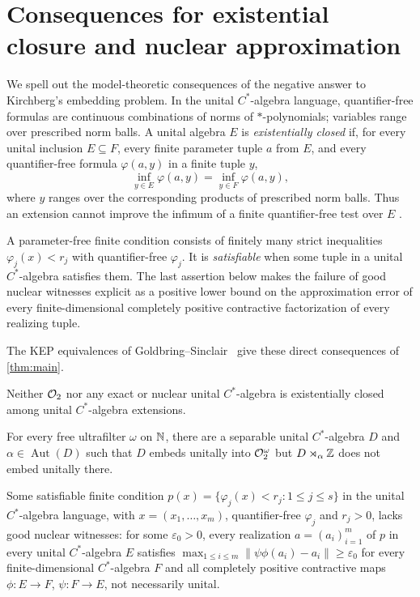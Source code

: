 \section{Consequences for existential closure and nuclear approximation}
\label{sec:consequences}

We spell out the model-theoretic consequences of the negative answer to
Kirchberg's embedding problem. In the unital $C^*$-algebra language,
quantifier-free formulas are continuous combinations of norms of
$*$-polynomials; variables range over prescribed norm balls.
A unital algebra $E$ is \emph{existentially closed} if, for every unital
inclusion $E\subseteq F$, every finite parameter tuple $a$ from $E$,
and every quantifier-free formula $\varphi(a,y)$ in a finite tuple $y$,
\[
 \inf_{y\in E}\varphi(a,y)=\inf_{y\in F}\varphi(a,y),
\]
where $y$ ranges over the corresponding products of prescribed norm balls.
Thus an extension
cannot improve the infimum of a finite quantifier-free test over $E$
\cite[Section~2.1]{GoldbringSinclair2015}.

A parameter-free finite condition consists of finitely many strict
inequalities $\varphi_j(x)<r_j$ with quantifier-free $\varphi_j$.
It is \emph{satisfiable} when some tuple in a unital $C^*$-algebra
satisfies them. The last assertion below makes the failure of good nuclear
witnesses explicit as a positive lower bound on the approximation error
of every finite-dimensional completely positive contractive factorization
of every realizing tuple.

The KEP equivalences of
Goldbring--Sinclair~\cite[Proposition~3.2 and Theorems~3.3 and~3.7]{GoldbringSinclair2015}
give these direct consequences of \cref{thm:main}.

\begin{corollary}\label{cor:kep-consequences}
Neither $\mathcal O_2$ nor any exact or nuclear unital $C^*$-algebra is
existentially closed among unital $C^*$-algebra extensions.

For every free ultrafilter $\omega$ on $\mathbb N$, there are a separable
unital $C^*$-algebra $D$ and $\alpha\in\operatorname{Aut}(D)$ such that
$D$ embeds unitally into $\mathcal O_2^\omega$ but $D\rtimes_\alpha\mathbb Z$ does not
embed unitally there.

Some satisfiable finite condition
$p(x)=\{\varphi_j(x)<r_j:1\le j\le s\}$ in the unital $C^*$-algebra
language, with $x=(x_1,\ldots,x_m)$, quantifier-free $\varphi_j$ and
$r_j>0$, lacks good nuclear witnesses: for some $\varepsilon_0>0$,
every realization $a=(a_i)_{i=1}^m$ of $p$ in every unital $C^*$-algebra
$E$ satisfies $\max_{1\le i\le m}\|\psi\phi(a_i)-a_i\|\ge\varepsilon_0$
for every finite-dimensional $C^*$-algebra $F$ and all completely positive
contractive maps $\phi:E\to F$, $\psi:F\to E$, not necessarily unital.
\end{corollary}

